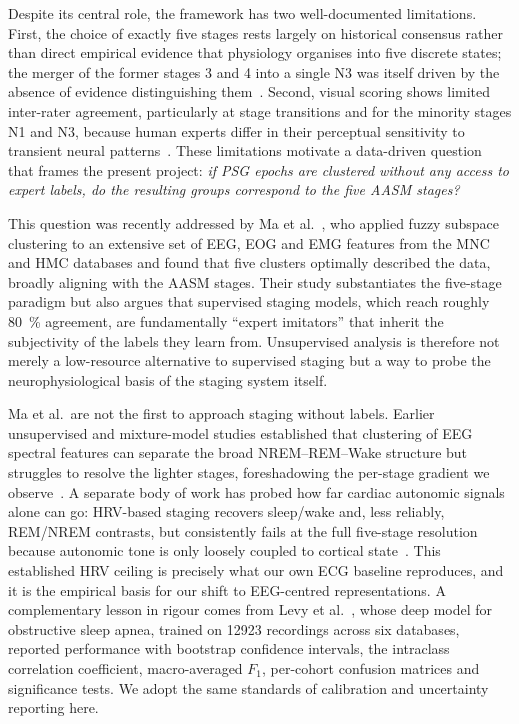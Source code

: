 \documentclass[11pt,a4paper]{article}
\begin{document}
Despite its central role, the framework has two well-documented limitations.
First, the choice of exactly five stages rests largely on historical consensus
rather than direct empirical evidence that physiology organises into five discrete
states; the merger of the former stages 3 and 4 into a single N3 was itself driven
by the absence of evidence distinguishing them~\cite{ma2026}. Second, visual
scoring shows limited inter-rater agreement, particularly at stage transitions and
for the minority stages N1 and N3, because human experts differ in their
perceptual sensitivity to transient neural patterns~\cite{ma2026}. These
limitations motivate a data-driven question that frames the present project:
\emph{if PSG epochs are clustered without any access to expert labels, do the
resulting groups correspond to the five AASM stages?}

This question was recently addressed by Ma et al.~\cite{ma2026}, who applied fuzzy
subspace clustering to an extensive set of EEG, EOG and EMG features from the MNC
and HMC databases and found that five clusters optimally described the data,
broadly aligning with the AASM stages. Their study substantiates the five-stage
paradigm but also argues that supervised staging models, which reach roughly
\SI{80}{\percent} agreement, are fundamentally ``expert imitators'' that inherit
the subjectivity of the labels they learn from. Unsupervised analysis is therefore
not merely a low-resource alternative to supervised staging but a way to probe the
neurophysiological basis of the staging system itself.

Ma et al.\ are not the first to approach staging without labels. Earlier
unsupervised and mixture-model studies established that clustering of EEG spectral
features can separate the broad NREM--REM--Wake structure but struggles to resolve
the lighter stages, foreshadowing the per-stage gradient we observe~\cite{guenoune}.
A separate body of work has probed how far cardiac autonomic signals alone can go:
HRV-based staging recovers sleep/wake and, less reliably, REM/NREM contrasts, but
consistently fails at the full five-stage resolution because autonomic tone is only
loosely coupled to cortical state~\cite{boudreau}. This established HRV ceiling is
precisely what our own ECG baseline reproduces, and it is the empirical basis for
our shift to EEG-centred representations. A complementary lesson in rigour comes
from Levy et al.~\cite{levy2023}, whose deep model for obstructive sleep apnea,
trained on \num{12923} recordings across six databases, reported performance with
bootstrap confidence intervals, the intraclass correlation coefficient,
macro-averaged $F_1$, per-cohort confusion matrices and significance tests. We adopt
the same standards of calibration and uncertainty reporting here.
\end{document}
